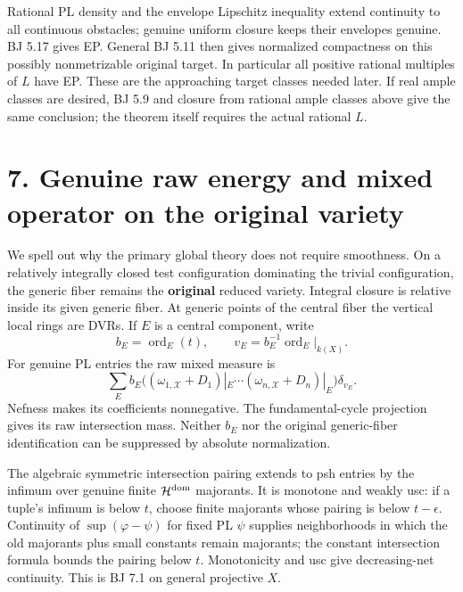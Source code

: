 \documentclass[
  10pt,
]{article}
\begin{document}
Rational PL density and the envelope Lipschitz inequality extend
continuity to all continuous obstacles; genuine uniform closure keeps
their envelopes genuine. BJ 5.17 gives EP. General BJ 5.11 then gives
normalized compactness on this possibly nonmetrizable original target.
In particular all positive rational multiples of \(L\) have EP. These
are the approaching target classes needed later. If real ample classes
are desired, BJ 5.9 and closure from rational ample classes above give
the same conclusion; the theorem itself requires the actual rational
\(L\).

\section{7. Genuine raw energy and mixed operator on the original
variety}\label{genuine-raw-energy-and-mixed-operator-on-the-original-variety}

We spell out why the primary global theory does not require smoothness.
On a relatively integrally closed test configuration dominating the
trivial configuration, the generic fiber remains the \textbf{original}
reduced variety. Integral closure is relative inside its given generic
fiber. At generic points of the central fiber the vertical local rings
are DVRs. If \(E\) is a central component, write
\[b_E=\operatorname{ord}_E(t),\qquad v_E=b_E^{-1}\operatorname{ord}_E|_{k(X)}.\]
For genuine PL entries the raw mixed measure is
\[\sum_E b_E\bigl((\omega_{1,\mathcal X}+D_1)|_E\cdots
                         (\omega_{n,\mathcal X}+D_n)|_E\bigr)\delta_{v_E}. \tag{7.1}\]
Nefness makes its coefficients nonnegative. The fundamental-cycle
projection gives its raw intersection mass. Neither \(b_E\) nor the
original generic-fiber identification can be suppressed by absolute
normalization.

The algebraic symmetric intersection pairing extends to psh entries by
the infimum over genuine finite \(\mathcal H^{\rm dom}\) majorants. It
is monotone and weakly usc: if a tuple's infimum is below \(t\), choose
finite majorants whose pairing is below \(t-\epsilon\). Continuity of
\(\sup(\varphi-\psi)\) for fixed PL \(\psi\) supplies neighborhoods in
which the old majorants plus small constants remain majorants; the
constant intersection formula bounds the pairing below \(t\).
Monotonicity and usc give decreasing-net continuity. This is BJ 7.1 on
general projective \(X\).
\end{document}
